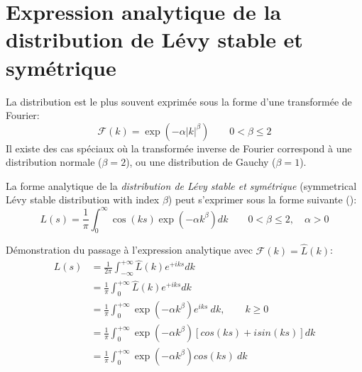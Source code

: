 \documentclass[12pt, oneside]{report}
\begin{document}
\chapter*{Expression analytique de la distribution de Lévy stable et symétrique}
La distribution est le plus souvent exprimée sous la forme d’une transformée de Fourier:
\begin{equation}\label{eq:fourier_levy}
    \mathcal{F}(k) = \exp(-\alpha|k|^{\beta}) \qquad  0 < \beta \leq 2
\end{equation}
Il existe des cas spéciaux où la transformée inverse de Fourier correspond à une distribution
normale ($\beta = 2$), ou une distribution de Gauchy ($\beta = 1$).

La forme analytique de la \emph{distribution de Lévy stable et symétrique} (symmetrical Lévy stable distribution with index $\beta$) peut
s’exprimer sous la forme suivante (\cite{Gutowski2001}):
\begin{equation}\label{eq:dist_levy}
    L(s) = \frac{1}{\pi} \int_{0}^{\infty} \cos(k s)\exp(-\alpha k^{\beta}) dk \qquad  0 < \beta \leq 2, \quad \alpha > 0
\end{equation}

Démonstration du passage à l’expression analytique avec $\mathcal{F}(k) = \hat{L}(k)$:
\begin{equation}
    \begin{split}
        L(s) &= \frac{1}{2\pi}\int_{-\infty}^{+\infty}\hat{L}(k)e^{+iks} dk\\
             &= \frac{1}{\pi}\int_{0}^{+\infty}\hat{L}(k)e^{+iks} dk\\
             &= \frac{1}{\pi}\int_{0}^{+\infty}\exp(-\alpha k^{\beta})  e^{iks} \ dk, \qquad k \geqslant 0\\
             &= \frac{1}{\pi}\int_{0}^{+\infty}\exp(-\alpha k^{\beta})  \left[cos(ks) + isin(ks)\right] dk\\
             &= \frac{1}{\pi}\int_{0}^{+\infty}\exp(-\alpha k^{\beta})  cos(ks) ~dk
    \end{split}
\end{equation}
\end{document}
